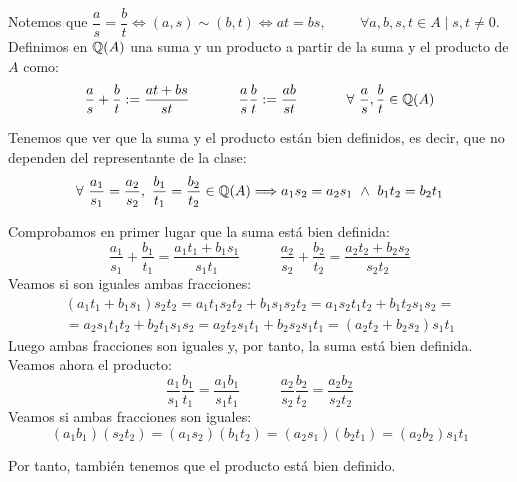 \noindent
Notemos que $\dfrac{a}{s} = \dfrac{b}{t} \Longleftrightarrow (a,s) \sim (b,t) \Longleftrightarrow at = bs,\hspace{1cm}\forall a,b,s,t \in A \mid s,t \neq 0$.\\

Definimos en $\mathbb Q(A)$ una suma y un producto a partir de la suma y el producto de $A$ como:
$$\dfrac{a}{s} + \dfrac{b}{t} := \dfrac{at + bs}{st}\hspace{1cm}~~\dfrac{a}{s}\dfrac{b}{t} := \dfrac{ab}{st}\hspace{1cm}~~\forall  ~\dfrac{a}{s},
    \dfrac{b}{t} \in \mathbb Q(A)$$
    
Tenemos que ver que la suma y el producto están bien definidos, es decir, que no dependen del representante de la clase:
$$\forall ~\dfrac{a_1}{s_1} = \dfrac{a_2}{s_2}, ~\dfrac{b_1}{t_1} = \dfrac{b_2}{t_2} \in \mathbb Q(A) \Longrightarrow a_1s_2 = a_2 s_1
    \ \land \  b_1 t_2 = b_2 t_1$$

Comprobamos en primer lugar que la suma está bien definida:
$$\dfrac{a_1}{s_1} + \dfrac{b_1}{t_1} = \dfrac{a_1t_1 + b_1s_1}{s_1t_1}\hspace{1cm}~~
    \dfrac{a_2}{s_2} + \dfrac{b_2}{t_2} = \dfrac{a_2t_2 + b_2s_2}{s_2t_2}$$
Veamos si son iguales ambas fracciones:
\begin{multline*}
    (a_1t_1 + b_1s_1)s_2t_2 = a_1t_1s_2t_2 + b_1s_1s_2t_2 = a_1s_2t_1t_2 + b_1t_2s_1s_2 = \\
    =a_2s_1t_1t_2 + b_2t_1s_1s_2 = a_2t_2s_1t_1 + b_2s_2s_1t_1 = (a_2t_2 + b_2s_2)s_1t_1
\end{multline*}
Luego ambas fracciones son iguales y, por tanto, la suma está bien definida. Veamos ahora el producto:
$$\dfrac{a_1}{s_1}\dfrac{b_1}{t_1} = \dfrac{a_1b_1}{s_1t_1}\hspace{1cm}~~
    \dfrac{a_2}{s_2}\dfrac{b_2}{t_2} = \dfrac{a_2b_2}{s_2t_2}$$
Veamos si ambas fracciones son iguales:
$$(a_1b_1)(s_2t_2) = (a_1s_2)(b_1t_2) = (a_2s_1)(b_2t_1) = (a_2b_2)s_1t_1$$

Por tanto, también tenemos que el producto está bien definido.

